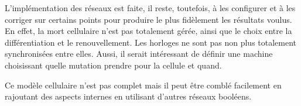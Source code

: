 \documentclass[11pt, a4paper]{article}
\begin{document}
L'implémentation des réseaux est faite, il reste, toutefois, à les configurer
et à les corriger sur certains points pour produire le plus fidèlement les
résultats voulus. En effet, la mort cellulaire n'est pas totalement gérée,
ainsi que le choix entre la différentiation et le renouvellement. Les horloges
ne sont pas non plus totalement synchronisées entre elles. Aussi, il serait
intéressant de définir une machine choisissant quelle mutation prendre pour la
cellule et quand.

Ce modèle cellulaire n'est pas complet mais il peut être comblé facilement en
rajoutant des aspects internes en utilisant d'autres réseaux booléens.

\newpage


\end{document}
